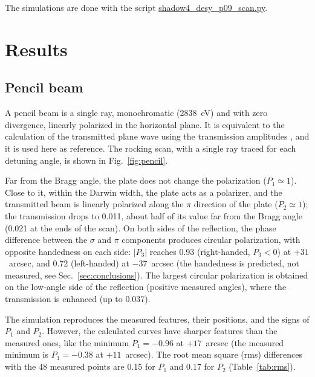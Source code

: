 \documentclass{iucr}
\begin{document}
The simulations are done with the script \url{shadow4_desy_p09_scan.py}.


\section{Results}
\label{sec:results}

\subsection{Pencil beam}
\label{sec:pencil}

A pencil beam is a single ray, monochromatic (2838~eV) and with zero divergence, linearly polarized in the horizontal plane. It is equivalent to the calculation of the transmitted plane wave using the transmission amplitudes \cite{PolarizationDraft}, and it is used here as reference. The rocking scan, with a single ray traced for each detuning angle, is shown in Fig.~\ref{fig:pencil}.

Far from the Bragg angle, the plate does not change the polarization ($P_1\simeq1$). Close to it, within the Darwin width, the plate acts as a polarizer, and the transmitted beam is linearly polarized along the $\pi$ direction of the plate ($P_2\simeq1$); the transmission drops to 0.011, about half of its value far from the Bragg angle (0.021 at the ends of the scan). On both sides of the reflection, the phase difference between the $\sigma$ and $\pi$ components produces circular polarization, with opposite handedness on each side: $|P_3|$ reaches 0.93 (right-handed, $P_3<0$) at $+31$~arcsec, and 0.72 (left-handed) at $-37$~arcsec (the handedness is predicted, not measured, see Sec.~\ref{sec:conclusions}). The largest circular polarization is obtained on the low-angle side of the reflection (positive measured angles), where the transmission is enhanced (up to 0.037).

The simulation reproduces the measured features, their positions, and the signs of $P_1$ and $P_2$. However, the calculated curves have sharper features than the measured ones, like the minimum $P_1=-0.96$ at $+17$~arcsec (the measured minimum is $P_1=-0.38$ at $+11$~arcsec). The root mean square (rms) differences with the 48 measured points are 0.15 for $P_1$ and 0.17 for $P_2$ (Table~\ref{tab:rms}).
\end{document}
